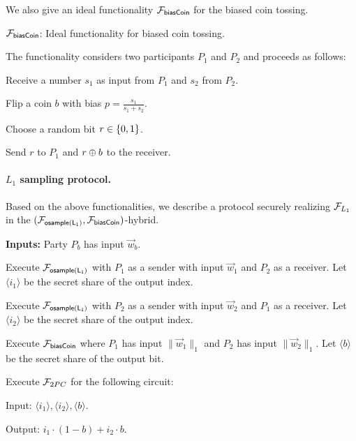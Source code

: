 \medskip
We also give an ideal functionality $\mathcal{F}_{{\mathsf{biasCoin}}}$ for the biased coin tossing. 

\bbox
{
\begin{center}
 $\mathcal{F}_{{\mathsf{biasCoin}}}$:  Ideal functionality for biased coin tossing.
\end{center}

The functionality considers two participants $P_1$ and $P_2$ and proceeds as
follows:

\BEN
\item Receive a number $s_1$ as input from $P_1$ and $s_2$ from $P_2$.  
\item Flip a coin $b$ with bias $p = \frac{s_1}{s_1 + s_2}$. 
\item Choose a random bit $r \in \{0,1\}$.
\item Send $r$ to $P_1$ and $r \oplus b$ to the receiver. 
\EEN 
}

\medskip

\paragraph{$L_1$ sampling protocol.}
Based on the above functionalities, we describe a protocol securely realizing
$\mathcal{F}_{L_1}$ in the $(\F_\oslone, \F_\bcoin)$-hybrid. 

\begin{algorithm}[h]
\textbf{Inputs:} Party $P_b$ has input $\vec{w}_b$. 

\BEN
\item Execute $\mathcal{F}_{\mathsf{osample(L_1)}}$ with $P_1$ as a sender with input $\vec{w}_1$
and $P_2$ as a receiver. Let $\langle i_1 \rangle$ be the secret share of the output
index. 

\item Execute $\mathcal{F}_{\mathsf{osample(L_1)}}$ with $P_2$ as a sender with input $\vec{w}_2$
and $P_1$ as a receiver. Let $\langle i_2 \rangle$ be the secret share of the output
index.

\item Execute $\mathcal{F}_{\mathsf{biasCoin}}$ where $P_1$ has input $\|\vec{w}_1\|_1$ and
$P_2$ has input $\|\vec{w}_2\|_1$. Let $\langle b \rangle$ be the secret share of the
output bit.

\item Execute $\mathcal{F}_{2PC}$ for the following circuit: 
      \BEN
      \item Input: $\langle i_1 \rangle, \langle i_2 \rangle, \langle b \rangle$. 
      \item Output: $i_1 \cdot (1-b) + i_2 \cdot b$.
      \EEN
\EEN

\caption{Two-party $L_1$ sampling in the $(\F_\oslone, \F_\bcoin)$-hybrid.}
\label{fig:l1}
\end{algorithm}

